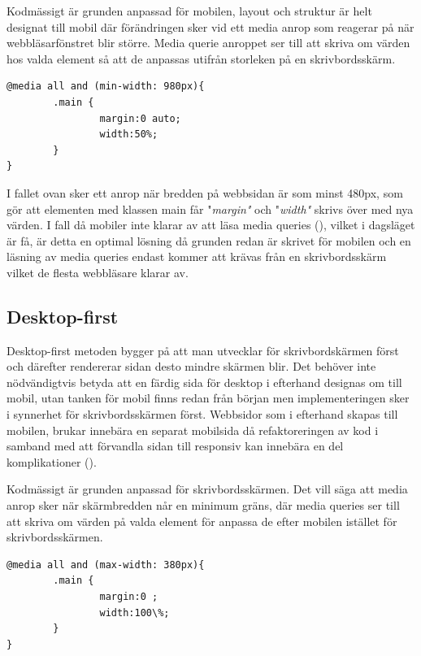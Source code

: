 \documentclass[11pt]{article}
\begin{document}
Kodmässigt är grunden anpassad för mobilen, layout och struktur är helt designat till mobil där förändringen sker vid ett media anrop som reagerar på när webbläsarfönstret blir större. Media querie anroppet ser till att skriva om värden hos valda element så att de anpassas utifrån storleken på en skrivbordsskärm.
 
\vspace{0.5cm}
 \begin{verbatim}
@media all and (min-width: 980px){
        .main {
                margin:0 auto;
                width:50%;
        }
}
\end{verbatim}

\vspace{0.5cm}
I fallet ovan sker ett anrop när bredden på webbsidan är som minst 480px, som gör att elementen med klassen main får "\textit{margin"} och "\textit{width"} skrivs över med nya värden. I fall då mobiler inte klarar av att läsa media queries (\cite{adaptiveresp}), vilket i dagsläget är få, är detta en optimal lösning då grunden redan är skrivet för mobilen och en läsning av media queries endast kommer att krävas från en skrivbordsskärm vilket de flesta webbläsare klarar av.

\subsection{Desktop-first}
Desktop-first metoden bygger på att man utvecklar för skrivbordskärmen först och därefter rendererar sidan desto mindre skärmen blir. Det behöver inte nödvändigtvis betyda att en färdig sida för desktop i efterhand designas om till mobil, utan tanken för mobil finns redan från början men implementeringen sker i synnerhet för skrivbordsskärmen först. Webbsidor som i efterhand skapas till mobilen, brukar innebära en separat mobilsida då refaktoreringen av kod i samband med att förvandla sidan till responsiv kan innebära en del komplikationer (\cite{adaptiveresp}).  

Kodmässigt är grunden anpassad för skrivbordsskärmen. Det vill säga att media anrop sker när skärmbredden når en minimum gräns, där media queries ser till att skriva om värden på valda element för anpassa de efter mobilen istället för skrivbordsskärmen.


\vspace{0.5cm}
 \begin{verbatim}
@media all and (max-width: 380px){
        .main {
                margin:0 ;
                width:100\%;
        }
}
\end{verbatim}
\vspace{0.5cm}
\end{document}

